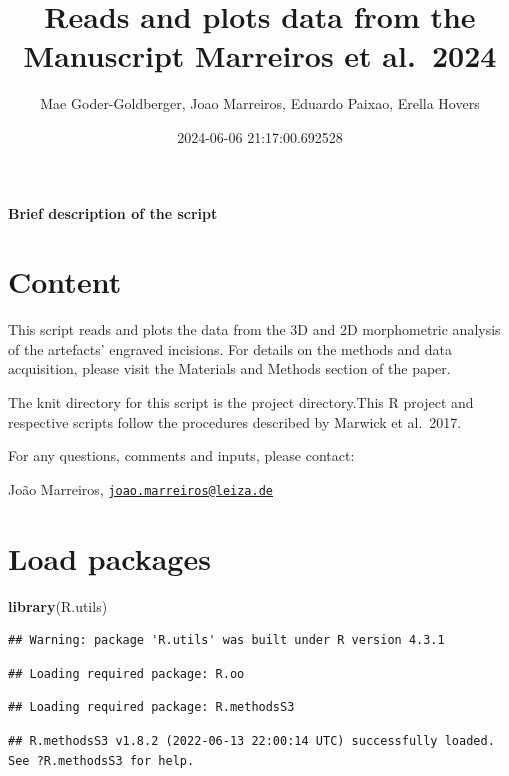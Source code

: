 \documentclass[
]{article}
\title{Reads and plots data from the Manuscript Marreiros et al.~2024}
\author{Mae Goder-Goldberger, Joao Marreiros, Eduardo Paixao, Erella
Hovers}
\date{2024-06-06 21:17:00.692528}
\newenvironment{Shaded}{\begin{snugshade}}{\end{snugshade}}
\newcommand{\FunctionTok}[1]{\textcolor[rgb]{0.13,0.29,0.53}{\textbf{#1}}}
\newcommand{\NormalTok}[1]{#1}
\begin{document}
\maketitle

\textbf{Brief description of the script}

\hypertarget{content}{%
\section{Content}\label{content}}

This script reads and plots the data from the 3D and 2D morphometric
analysis of the artefacts' engraved incisions. For details on the
methods and data acquisition, please visit the Materials and Methods
section of the paper.

The knit directory for this script is the project directory.This R
project and respective scripts follow the procedures described by
Marwick et al.~2017.

For any questions, comments and inputs, please contact:

João Marreiros,
\href{mailto:joao.marreiros@leiza.de}{\nolinkurl{joao.marreiros@leiza.de}}

\hypertarget{load-packages}{%
\section{Load packages}\label{load-packages}}

\begin{Shaded}
\begin{Highlighting}[]
\FunctionTok{library}\NormalTok{(R.utils)}
\end{Highlighting}
\end{Shaded}

\begin{verbatim}
## Warning: package 'R.utils' was built under R version 4.3.1
\end{verbatim}

\begin{verbatim}
## Loading required package: R.oo
\end{verbatim}

\begin{verbatim}
## Loading required package: R.methodsS3
\end{verbatim}

\begin{verbatim}
## R.methodsS3 v1.8.2 (2022-06-13 22:00:14 UTC) successfully loaded. See ?R.methodsS3 for help.
\end{verbatim}
\end{document}
